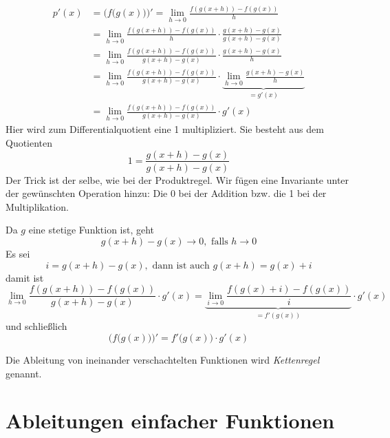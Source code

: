 \begin{equation}
\begin{split}
p'(x) &= \Big(f\big( g(x) \big)\Big)' = \lim_{h\rightarrow 0} \frac{f(g(x+h))-f(g(x))}{h}\\
&= \lim_{h\rightarrow 0} \frac{f(g(x+h))-f(g(x))}{h} \cdot \frac{g(x+h)-g(x)}{g(x+h)-g(x)} \\
&= \lim_{h\rightarrow 0} \frac{f(g(x+h))-f(g(x))}{g(x+h)-g(x)} \cdot \frac{g(x+h)-g(x)}{h} \\
&= \lim_{h\rightarrow 0} \frac{f(g(x+h))-f(g(x))}{g(x+h)-g(x)} \cdot \underbrace{\lim_{h\rightarrow 0} \frac{g(x+h)-g(x)}{h}}_{=g'(x)} \\
&= \lim_{h\rightarrow 0} \frac{f(g(x+h))-f(g(x))}{g(x+h)-g(x)} \cdot g'(x)
\end{split}
\end{equation}
Hier wird zum Differentialquotient eine 1 multipliziert. Sie besteht aus dem Quotienten
\begin{equation*}
1=\frac{g(x+h)-g(x)}{g(x+h)-g(x)}
\end{equation*}
Der Trick ist der selbe, wie bei der Produktregel. Wir fügen eine Invariante unter der gewünschten Operation hinzu: Die 0 bei der Addition bzw. die 1 bei der Multiplikation.

Da $g$ eine stetige Funktion ist, geht
\begin{equation*}
g(x+h)-g(x) \longrightarrow 0,\text{ falls } h\rightarrow 0
\end{equation*}
Es sei 
\begin{equation}
i = g(x+h)-g(x), \text{ dann ist auch } g(x+h) = g(x)+i
\end{equation}
damit ist
\begin{equation}
\lim_{h\rightarrow 0} \frac{f(g(x+h))-f(g(x))}{g(x+h)-g(x)} \cdot g'(x) = 
\underbrace{\lim_{i\rightarrow 0} \frac{f(g(x)+i)-f(g(x))}{i}}_{=f'(g(x))} \cdot g'(x)
\end{equation}
und schließlich
\begin{equation}
\Big(f\big( g(x) \big)\Big)' = f'\big( g(x)\big)\cdot g'(x)
\end{equation}
\begin{definition}
Die Ableitung von ineinander verschachtelten Funktionen wird \emph{Kettenregel} genannt.
\end{definition}

\section{Ableitungen einfacher Funktionen}

